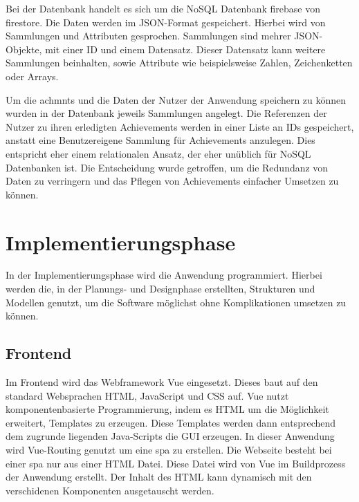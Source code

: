 \documentclass[11pt]{article}
\begin{document}
Bei der Datenbank handelt es sich um die \gls{NoSQL} Datenbank \gls{firebase}
von \gls{firestore}. Die Daten werden im JSON-Format gespeichert. Hierbei wird
von Sammlungen und Attributen gesprochen. Sammlungen sind mehrer JSON-Objekte, mit einer
ID und einem Datensatz. Dieser Datensatz kann weitere Sammlungen beinhalten,
sowie Attribute wie beispielsweise Zahlen, Zeichenketten oder Arrays.

Um die \glspl{achmnt} und die Daten der Nutzer der Anwendung speichern zu können
wurden in der Datenbank jeweils Sammlungen angelegt. Die Referenzen der Nutzer zu ihren
erledigten Achievements werden in einer Liste an IDs gespeichert, anstatt eine Benutzereigene Sammlung für Achievements
anzulegen. Dies entspricht eher einem relationalen Ansatz, der eher unüblich für NoSQL Datenbanken ist.
Die Entscheidung wurde getroffen, um die Redundanz von Daten zu verringern und das Pflegen von Achievements
einfacher Umsetzen zu können. 


%
%

\section{Implementierungsphase}
In der Implementierungsphase wird die Anwendung programmiert. Hierbei werden die,
in der Planungs- und Designphase erstellten, Strukturen und Modellen genutzt, um die Software möglichst ohne
Komplikationen umsetzen zu können.

\subsection{Frontend}


Im Frontend wird das Webframework Vue eingesetzt. Dieses baut auf den
standard Websprachen HTML, JavaScript und CSS auf. 
Vue nutzt komponentenbasierte Programmierung, indem es HTML um die Möglichkeit
erweitert, Templates zu erzeugen. Diese Templates werden dann entsprechend dem zugrunde 
liegenden Java-Scripts die GUI erzeugen. %
In dieser Anwendung wird Vue-Routing genutzt um eine \gls{spa} zu
erstellen. Die Webseite besteht bei einer \gls{spa} nur aus einer HTML Datei. Diese Datei
wird von Vue im Buildprozess der Anwendung erstellt. Der Inhalt des HTML kann dynamisch mit den
verschidenen Komponenten ausgetauscht werden.
\end{document}
